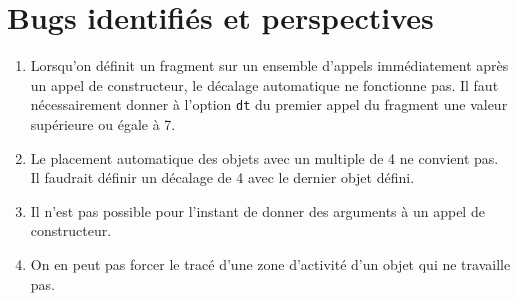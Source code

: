 \documentclass[a4paper,11pt]{report}
\newcommand{\inputTikZ}[1]{%
  }%
\newcommand{\inputTikZ}[1]{%
    \texttt{[image: fig/\#1.pdf]}%
  }%
\begin{document}
\begin{center}
\inputTikZ{seqdiagstep4}
\end{center}

\section{Bugs identifiés et perspectives}\label{s.seqbug}

\begin{enumerate}
\item Lorsqu'on définit un fragment sur un ensemble d'appels immédiatement après un appel de constructeur, le décalage automatique ne fonctionne pas. Il faut nécessairement donner à l'option {\tt dt} du premier appel du fragment une valeur supérieure ou égale à 7.
\item Le placement automatique des objets avec un multiple de 4 ne convient pas. Il faudrait définir un décalage de 4 avec le dernier objet défini.
\item Il n'est pas possible pour l'instant de donner des arguments à un appel de constructeur.
\item On en peut pas forcer le tracé d'une zone d'activité d'un objet qui ne \og travaille\fg{} pas.

\begin{center}
\inputTikZ{bugcall}
\end{center}

\end{enumerate}
\end{document}
